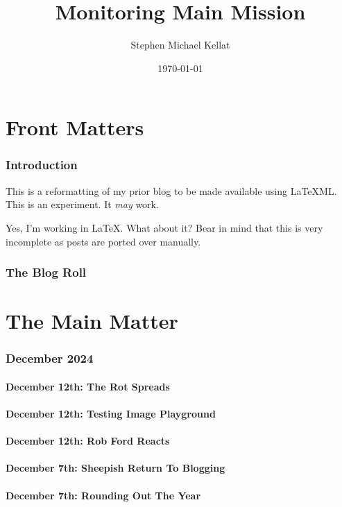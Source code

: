 \documentclass[12pt,letterpaper]{report}
\title{Monitoring Main Mission}
\author{Stephen Michael Kellat}
\date{\today}
\begin{document}
\maketitle
\tableofcontents
\part{Front Matters}
\section{Introduction}
This is a reformatting of my prior blog to be made available using LaTeXML.  This is an experiment.  It \emph{may} work.  

Yes, I'm working in \LaTeX.  What about it?  Bear in mind that this is very incomplete as posts are ported over manually.
\section{The Blog Roll}

\part{The Main Matter}
\section{December 2024}
\subsection{December 12th: The Rot Spreads}

\subsection{December 12th: Testing Image Playground}

\subsection{December 12th: Rob Ford Reacts}

\subsection{December 7th: Sheepish Return To Blogging}

\subsection{December 7th: Rounding Out The Year}

\end{document}
